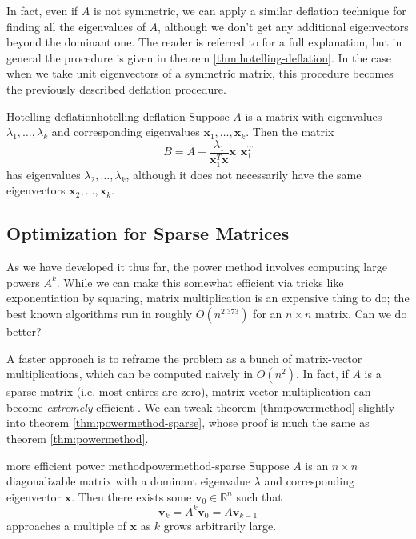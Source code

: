 \documentclass{article}
\let\vec\mathbf
\begin{document}
In fact, even if $A$ is not symmetric, we can apply a similar deflation technique for finding all the eigenvalues of $A$, although we don't get any additional eigenvectors beyond the dominant one. The reader is referred to \cite{deflation} for a full explanation, but in general the procedure is given in theorem \ref{thm:hotelling-deflation}. In the case when we take unit eigenvectors of a symmetric matrix, this procedure becomes the previously described deflation procedure.

\begin{theorem}{Hotelling deflation}{hotelling-deflation}
  Suppose $A$ is a matrix with eigenvalues $\lambda_1, \ldots, \lambda_k$ and corresponding eigenvalues $\vec{x}_1, \ldots, \vec{x}_k$. Then the matrix
  \begin{equation*}
    B = A - \frac{\lambda_1}{\vec{x}_1^T\vec{x}}\vec{x}_1\vec{x}_1^T
  \end{equation*}
  has eigenvalues $\lambda_2, \ldots, \lambda_k$, although it does not necessarily have the same eigenvectors $\vec{x}_2, \ldots, \vec{x}_k$.
\end{theorem}

\subsection{Optimization for Sparse Matrices}
As we have developed it thus far, the power method involves computing large powers $A^k$. While we can make this somewhat efficient via tricks like exponentiation by squaring, matrix multiplication is an expensive thing to do; the best known algorithms run in roughly $O(n^{2.373})$ \cite{matmul} for an $n \times n$ matrix. Can we do better?

A faster approach is to reframe the problem as a bunch of matrix-vector multiplications, which can be computed naively in $O(n^2)$. In fact, if $A$ is a sparse matrix (i.e. most entires are zero), matrix-vector multiplication can become \emph{extremely} efficient \cite{pwr-rot}. We can tweak theorem \ref{thm:powermethod} slightly into theorem \ref{thm:powermethod-sparse}, whose proof is much the same as theorem \ref{thm:powermethod}.

\begin{theorem}{more efficient power method}{powermethod-sparse}
  Suppose $A$ is an $n \times n$ diagonalizable matrix with a dominant eigenvalue $\lambda$ and corresponding eigenvector $\vec{x}$. Then there exists some $\vec{v}_0 \in \mathbb{R}^n$ such that
  \begin{equation*}
    \vec{v}_k = A^k\vec{v}_0 = A\vec{v}_{k-1}
  \end{equation*}
  approaches a multiple of $\vec{x}$ as $k$ grows arbitrarily large.
\end{theorem}
\end{document}

